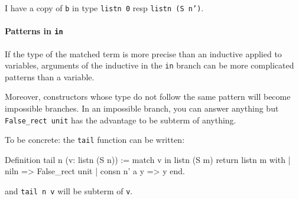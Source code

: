 I have a copy of {\tt b} in type {\tt listn 0} resp {\tt listn (S n')}.



\paragraph{Patterns in {\tt in}}
\label{match-in-patterns}

If the type of the matched term is more precise than an inductive applied to
variables, arguments of the inductive in the {\tt in} branch can be more
complicated patterns than a variable.

Moreover, constructors whose type do not follow the same pattern will
become impossible branches. In an impossible branch, you can answer
anything but {\tt False\_rect unit} has the advantage to be subterm of
anything. %

To be concrete: the {\tt tail} function can be written:
\begin{coq_example}
Definition tail n (v: listn (S n)) :=
  match v in listn (S m) return listn m with
  | niln => False_rect unit
  | consn n' a y => y
  end.
\end{coq_example}
and {\tt tail n v} will be subterm of {\tt v}.

